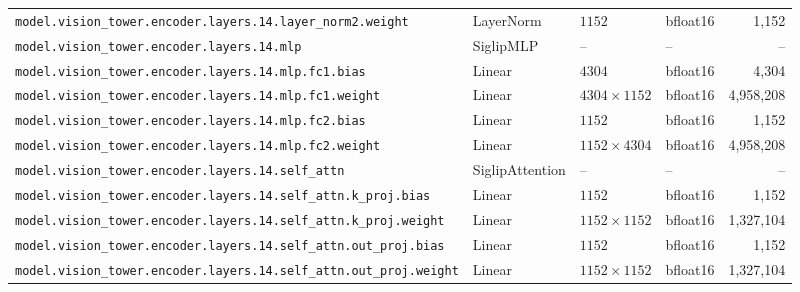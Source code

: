 \documentclass[10pt,a4paper]{article}
\theoremstyle{definition}
\begin{document}
\begin{appendices}
{\begin{longtable}{p{6.8cm}>{\raggedright\arraybackslash}p{3.3cm}llr}
\texttt{model.\allowbreak{}vision\_tower.\allowbreak{}encoder.\allowbreak{}layers.\allowbreak{}14.\allowbreak{}layer\_norm2.\allowbreak{}weight} & Layer\allowbreak{}Norm & $1152$ & bfloat16 & 1,152 \\
\texttt{model.\allowbreak{}vision\_tower.\allowbreak{}encoder.\allowbreak{}layers.\allowbreak{}14.\allowbreak{}mlp} & Siglip\allowbreak{}MLP & -- & -- & -- \\
\texttt{model.\allowbreak{}vision\_tower.\allowbreak{}encoder.\allowbreak{}layers.\allowbreak{}14.\allowbreak{}mlp.\allowbreak{}fc1.\allowbreak{}bias} & Linear & $4304$ & bfloat16 & 4,304 \\
\texttt{model.\allowbreak{}vision\_tower.\allowbreak{}encoder.\allowbreak{}layers.\allowbreak{}14.\allowbreak{}mlp.\allowbreak{}fc1.\allowbreak{}weight} & Linear & $4304 \times 1152$ & bfloat16 & 4,958,208 \\
\texttt{model.\allowbreak{}vision\_tower.\allowbreak{}encoder.\allowbreak{}layers.\allowbreak{}14.\allowbreak{}mlp.\allowbreak{}fc2.\allowbreak{}bias} & Linear & $1152$ & bfloat16 & 1,152 \\
\texttt{model.\allowbreak{}vision\_tower.\allowbreak{}encoder.\allowbreak{}layers.\allowbreak{}14.\allowbreak{}mlp.\allowbreak{}fc2.\allowbreak{}weight} & Linear & $1152 \times 4304$ & bfloat16 & 4,958,208 \\
\texttt{model.\allowbreak{}vision\_tower.\allowbreak{}encoder.\allowbreak{}layers.\allowbreak{}14.\allowbreak{}self\_attn} & Siglip\allowbreak{}Attention & -- & -- & -- \\
\texttt{model.\allowbreak{}vision\_tower.\allowbreak{}encoder.\allowbreak{}layers.\allowbreak{}14.\allowbreak{}self\_attn.\allowbreak{}k\_proj.\allowbreak{}bias} & Linear & $1152$ & bfloat16 & 1,152 \\
\texttt{model.\allowbreak{}vision\_tower.\allowbreak{}encoder.\allowbreak{}layers.\allowbreak{}14.\allowbreak{}self\_attn.\allowbreak{}k\_proj.\allowbreak{}weight} & Linear & $1152 \times 1152$ & bfloat16 & 1,327,104 \\
\texttt{model.\allowbreak{}vision\_tower.\allowbreak{}encoder.\allowbreak{}layers.\allowbreak{}14.\allowbreak{}self\_attn.\allowbreak{}out\_proj.\allowbreak{}bias} & Linear & $1152$ & bfloat16 & 1,152 \\
\texttt{model.\allowbreak{}vision\_tower.\allowbreak{}encoder.\allowbreak{}layers.\allowbreak{}14.\allowbreak{}self\_attn.\allowbreak{}out\_proj.\allowbreak{}weight} & Linear & $1152 \times 1152$ & bfloat16 & 1,327,104 \\

\end{longtable}}
\end{appendices}
\end{document}

